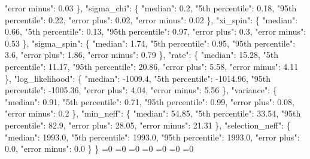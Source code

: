 {{        "error minus": 0.03%
      \}, %
      "sigma\_chi": \{%
        "median": 0.2, %
        "5th percentile": 0.18, %
        "95th percentile": 0.22, %
        "error plus": 0.02, %
        "error minus": 0.02%
      \}, %
      "xi\_spin": \{%
        "median": 0.66, %
        "5th percentile": 0.13, %
        "95th percentile": 0.97, %
        "error plus": 0.3, %
        "error minus": 0.53%
      \}, %
      "sigma\_spin": \{%
        "median": 1.74, %
        "5th percentile": 0.95, %
        "95th percentile": 3.6, %
        "error plus": 1.86, %
        "error minus": 0.79%
      \}, %
      "rate": \{%
        "median": 15.28, %
        "5th percentile": 11.17, %
        "95th percentile": 20.86, %
        "error plus": 5.58, %
        "error minus": 4.11%
      \}, %
      "log\_likelihood": \{%
        "median": {-}1009.4, %
        "5th percentile": {-}1014.96, %
        "95th percentile": {-}1005.36, %
        "error plus": 4.04, %
        "error minus": 5.56%
      \}, %
      "variance": \{%
        "median": 0.91, %
        "5th percentile": 0.71, %
        "95th percentile": 0.99, %
        "error plus": 0.08, %
        "error minus": 0.2%
      \}, %
      "min\_neff": \{%
        "median": 54.85, %
        "5th percentile": 33.54, %
        "95th percentile": 82.9, %
        "error plus": 28.05, %
        "error minus": 21.31%
      \}, %
      "selection\_neff": \{%
        "median": 1993.0, %
        "5th percentile": 1993.0, %
        "95th percentile": 1993.0, %
        "error plus": 0.0, %
        "error minus": 0.0%
      \}%
    \}}%
  \else%
    \ifnum{}=0%
      \let\MagBetaConstrainedIidTiltIsotropicAlignedNid@I@out\MagBetaConstrainedIidTiltIsotropicAlignedNid@III%
    \else%
      \ifnum{}=0%
      \let\MagBetaConstrainedIidTiltIsotropicAlignedNid@I@out\MagBetaConstrainedIidTiltIsotropicAlignedNid@IV%
    \else%
      \ifnum{}=0%
      \let\MagBetaConstrainedIidTiltIsotropicAlignedNid@I@out\MagBetaConstrainedIidTiltIsotropicAlignedNid@V%
    \else%
      \ifnum{}=0%
      \let\MagBetaConstrainedIidTiltIsotropicAlignedNid@I@out\MagBetaConstrainedIidTiltIsotropicAlignedNid@VI%
    \else%
      \ifnum{}=0%
      \let\MagBetaConstrainedIidTiltIsotropicAlignedNid@I@out\MagBetaConstrainedIidTiltIsotropicAlignedNid@VII%
    \else%
      \ifnum{}=0%
      \let\MagBetaConstrainedIidTiltIsotropicAlignedNid@I@out\MagBetaConstrainedIidTiltIsotropicAlignedNid@VIII%
    \else%
      \ifnum{}=0%
}
